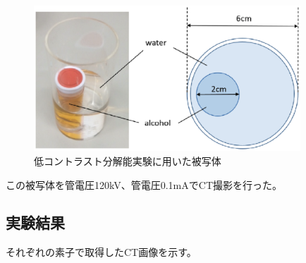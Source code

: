 \begin{figure}[H]
 \begin{center}
 \includegraphics[width=10cm]{image2/chapter5/phantom1.eps}
 \end{center}
 \caption{低コントラスト分解能実験に用いた被写体}
 \label{fig:phantom1}
\end{figure}

この被写体を管電圧120kV、管電圧0.1mAでCT撮影を行った。

\subsection{実験結果}

それぞれの素子で取得したCT画像を示す。


